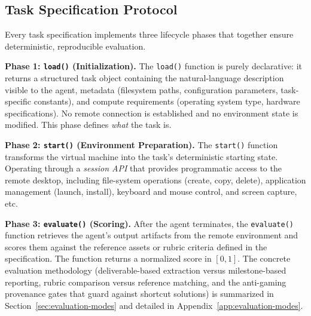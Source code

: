 \subsection{Task Specification Protocol}
\label{app:task-spec-protocol}

Every task specification implements three lifecycle phases that together ensure deterministic, reproducible evaluation.

\noindent \textbf{Phase 1: \texttt{load()} (Initialization).}
The \texttt{load()} function is purely declarative: it returns a structured task object containing the natural-language description visible to the agent, metadata (filesystem paths, configuration parameters, task-specific constants), and compute requirements (operating system type, hardware specifications). No remote connection is established and no environment state is modified. This phase defines \emph{what} the task is.

\noindent \textbf{Phase 2: \texttt{start()} (Environment Preparation).}
The \texttt{start()} function transforms the virtual machine into the task's deterministic starting state. Operating through a \emph{session API} that provides programmatic access to the remote desktop, including file-system operations (create, copy, delete), application management (launch, install), keyboard and mouse control, and screen capture, etc.

\noindent \textbf{Phase 3: \texttt{evaluate()} (Scoring).}
After the agent terminates, the \texttt{evaluate()} function retrieves the agent's output artifacts from the remote environment and scores them against the reference assets or rubric criteria defined in the specification. The function returns a normalized score in $[0, 1]$. The concrete evaluation methodology (deliverable-based extraction versus milestone-based reporting, rubric comparison versus reference matching, and the anti-gaming provenance gates that guard against shortcut solutions) is summarized in Section~\ref{sec:evaluation-modes} and detailed in Appendix~\ref{app:evaluation-modes}.
